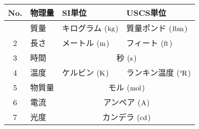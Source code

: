 \begin{tabular}{clll}
\index{SIたんい@SI単位}%
 No. & 物理量 & SI単位 & USCS単位 \\
 \hline
 \tblstrut
 1 & 質量 & キログラム ($\unit*{kg}$) & 質量ポンド ($\unit*{lbm}$) \\
 2 & 長さ & メートル ($\unit*{m}$) & フィート ($\unit*{ft}$) \\
 3 & 時間 & \multicolumn{2}{c}{秒 ($\unit*{s}$)} \\
 4 & 温度 & ケルビン ($\unit*{K}$) & ランキン温度 ($\unit*{\degR}$) \\
 5 & 物質量 & \multicolumn{2}{c}{モル ($\unit*{mol}$)} \\
 6 & 電流 & \multicolumn{2}{c}{アンペア ($\unit*{A}$)} \\
 7 & 光度 & \multicolumn{2}{c}{カンデラ ($\unit*{cd}$)} \\
 \hline
\end{tabular}
